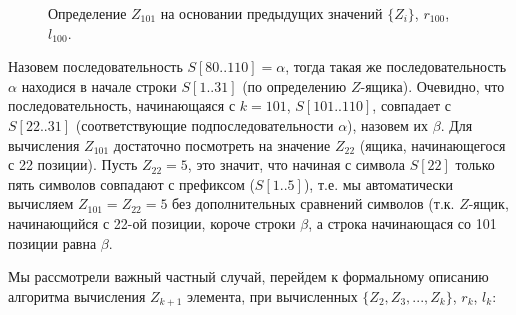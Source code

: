 \documentclass[letterpaper, 11pt]{article}
\begin{document}
\begin{figure}[H]
  \caption{Определение $Z_{101}$ на основании предыдущих значений $\{Z_i\}$, $r_{100}$, $l_{100}$.}
\end{figure}
\par
Назовем последовательность $S[80..110] = \alpha$, тогда такая же последовательность $\alpha$ находися в начале строки $S[1..31]$ (по определению $Z$-ящика). Очевидно, что последовательность, начинающаяся с $k = 101$, $S[101..110]$, совпадает с $S[22..31]$ (соответствующие подпоследовательности $\alpha$), назовем их $\beta$. Для вычисления $Z_{101}$ достаточно посмотреть на значение $Z_{22}$ (ящика, начинающегося с 22 позиции). Пусть $Z_{22} = 5$, это значит, что начиная с символа $S[22]$ только пять символов совпадают с префиксом ($S[1..5]$), т.е. мы автоматически вычисляем $Z_{101} = Z_{22} = 5$ без дополнительных сравнений символов (т.к. $Z$-ящик, начинающийся с 22-ой позиции, короче строки $\beta$, а строка начинающася со 101 позиции равна $\beta$.
\par
Мы рассмотрели важный частный случай, перейдем к формальному описанию алгоритма вычисления $Z_{k+1}$ элемента, при вычисленных $\{Z_2, Z_3, ..., Z_k\}$, $r_k$, $l_k$:
\end{document}
